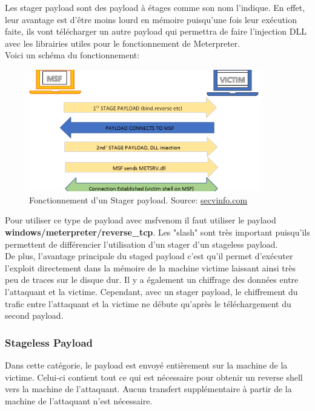 Les stager payload sont des payload à étages comme son nom l'indique. En effet, leur avantage est d'être moins lourd en mémoire puisqu'une fois leur exécution faite, ils vont télécharger un autre payload qui permettra de faire l'injection DLL avec les librairies utiles pour le fonctionnement de Meterpreter.\\



 Voici un schéma du fonctionnement:

\begin{figure}[htp!]
  \centering
  \setlength\figureheight{7cm}
  \setlength\figurewidth{9cm}
  \includegraphics[width=0.9\textwidth]{oui/images/Reverse_shell-meterpreter/stagepayload.png}
  \caption{Fonctionnement d'un Stager payload. Source: \url{secvinfo.com}}
  \label{fig:courbe-tikz}
\end{figure}


Pour utiliser ce type de payload avec msfvenom il faut utiliser le paylaod \textbf{windows/meterpreter/reverse\_tcp}. Les "slash" sont très important puisqu'ils permettent de différencier l'utilisation d'un stager d'un stageless payload.\\ De plus, l’avantage principale du staged payload c’est qu’il permet d’exécuter l’exploit directement dans la mémoire de la machine victime laissant ainsi très peu de traces sur le disque dur. Il y a également un chiffrage des données entre l'attaquant et la victime. Cependant, avec un stager payload, le chiffrement du trafic entre l’attaquant et la victime ne débute qu’après le téléchargement du second payload.

\subsubsection{Stageless Payload}

Dans cette catégorie, le payload est envoyé entièrement sur la machine de la victime. Celui-ci contient tout ce qui est nécessaire pour obtenir un reverse shell vers la machine de l’attaquant. Aucun transfert supplémentaire à partir de la machine de l’attaquant n’est nécessaire.\\

